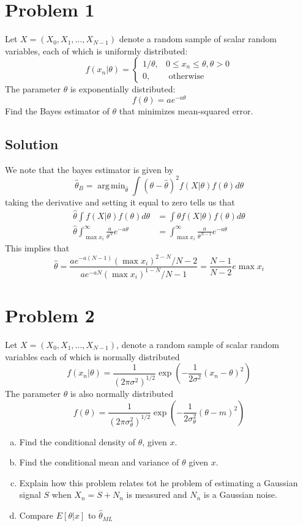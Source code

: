 \documentclass[a4paper]{article}
\DeclareMathOperator*{\argmin}{arg\,min}
\begin{document}
\section*{Problem 1}%
Let $X = (X_0, X_1, \dots, X_{N-1})$ denote a random sample of scalar random variables, each of which is uniformly distributed:
\[
  f(x_n|\theta) = 
  \begin{cases}
    1/\theta, & 0 \leq x_n \leq \theta, \theta > 0 \\
    0, & \text{ otherwise }
  \end{cases}
\]
The parameter $\theta$ is exponentially distributed:
\[
  f(\theta) = ae^{-a\theta}
\]
Find the Bayes estimator of $\theta$ that minimizes mean-squared error.

\subsection*{Solution}%
We note that the bayes estimator is given by
\[
  \hat{\theta}_B = \argmin_{\hat{\theta}} \int (\theta - \hat{\theta})^2 f(X|\theta) f(\theta) d \theta
\]
taking the derivative and setting it equal to zero tells us that
\[
  \begin{aligned}
    \hat{\theta} \int f(X|\theta) f(\theta) d \theta &= \int \theta f(X|\theta) f(\theta) d \theta \\
    \hat{\theta} \int_{\max x_i}^{\infty} \frac{a}{\theta^N} e^{-a \theta} &=  \int_{\max x_i}^{\infty} \frac{a}{\theta^{N-1}} e^{-a \theta}
  \end{aligned}
\]
This implies that
\[
  \hat{\theta} = \frac{ a e^{-a(N-1)} (\max x_i)^{2-N}/N-2}{a e^{-aN} (\max x_i)^{1-N}/N-1} = \frac{N-1}{N-2}e \max x_i
\]

\section*{Problem 2}%
Let $X = (X_0, X_1, \dots, X_{N-1})$, denote a random sample of scalar random variables each of which is normally distributed
\[
  f(x_n | \theta) = \frac{1}{(2 \pi \sigma^2)^{1/2}} \exp \left( - \frac{1}{2 \sigma^2} (x_n - \theta)^2 \right)
\]
The parameter $\theta$ is also normally distributed
\[
  f(\theta) = \frac{1}{(2 \pi \sigma^2_\theta)^{1/2}} \exp \left( - \frac{1}{2 \sigma^2_\theta}(\theta - m)^2 \right)
\]
\begin{enumerate}[a.]
  \item Find the conditional density of $\theta$, given $x$.
  \item Find the conditional mean and variance of $\theta$ given $x$.
  \item Explain how this problem relates tot he problem of estimating a Gaussian signal $S$ when $X_n = S + N_n$ is measured and $N_n$ is a Gaussian noise.
  \item Compare $E[\theta | x]$ to $\hat{\theta}_{ML}$
\end{enumerate}
\end{document}
